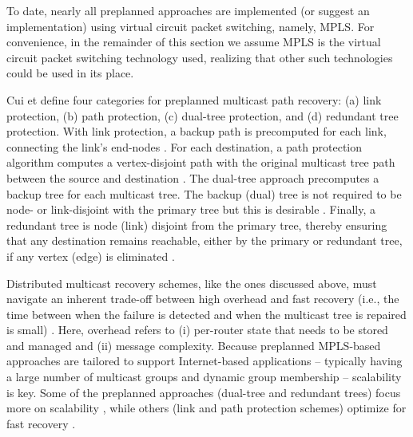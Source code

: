 To date, nearly all preplanned approaches \cite{Cui04,Fei01,Medard99,Pointurier02,Wu97} are implemented (or suggest an implementation) using 
virtual circuit packet switching, namely, MPLS. For convenience, in the remainder of this section
we assume MPLS is the virtual circuit packet switching technology used, realizing that other such technologies could be used in its place.

Cui et \cite{Cui04} define four categories for preplanned multicast path recovery: (a) link protection, (b) path protection, (c) dual-tree protection, and (d) redundant tree protection.
With link protection, a backup path is precomputed for each link, connecting the link's end-nodes \cite{Pointurier02,Wu97}. 
For each destination, a path protection algorithm computes a vertex-disjoint path with the original multicast tree path between the source and destination \cite{Wu97}. 
The dual-tree approach precomputes a backup tree for each multicast tree. The backup (dual) tree is not required to be node- or link-disjoint with the primary tree but this is desirable \cite{Fei01}.
Finally, a redundant tree is node (link) disjoint from the primary tree, thereby ensuring that any destination remains reachable, either by the primary or redundant tree, if any vertex 
(edge) is eliminated \cite{Medard99}. 







Distributed multicast recovery schemes, like the ones discussed above, must navigate an inherent trade-off between high overhead and fast recovery (i.e., the time between when the failure is detected and when the
multicast tree is repaired is small) \cite{Cui04}. 
Here, overhead refers to (i) per-router state that needs to be stored and managed and (ii) message complexity. %
Because preplanned MPLS-based approaches are tailored to support Internet-based applications -- typically having a large number of multicast groups and dynamic group membership -- scalability is key.
Some of the preplanned approaches (dual-tree and redundant trees) focus more on scalability \cite{Cui04,Fei01,Medard99}, while others 
(link and path protection schemes) optimize for fast recovery \cite{Pointurier02,Wu97}.  


